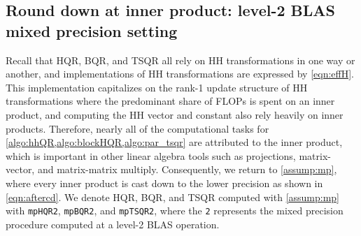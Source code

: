 \documentclass[review,onefignum,onetabnum]{siamart190516}
\begin{document}
\subsection{Round down at inner product: level-2 BLAS mixed precision setting}\label{sec:mp-2}
Recall that HQR, BQR, and TSQR all rely on HH transformations in one way or another, and implementations of HH transformations are expressed by \cref{eqn:effH}.
This implementation capitalizes on the rank-1 update structure of HH transformations where the predominant share of FLOPs is spent on an inner product, and computing the HH vector and constant also rely heavily on inner products.
Therefore, nearly all of the computational tasks for \cref{algo:hhQR,algo:blockHQR,algo:par_tsqr} are attributed to the inner product, which is important in other linear algebra tools such as projections, matrix-vector, and matrix-matrix multiply.
Consequently, we return to \cref{assump:mp}, where every inner product is cast down to the lower precision as shown in \cref{eqn:aftercd}. 
We denote HQR, BQR, and TSQR computed with \cref{assump:mp} with {\tt mpHQR2}, {\tt mpBQR2}, and {\tt mpTSQR2}, where the {\tt 2} represents the mixed precision procedure computed at a level-2 BLAS operation.
\end{document}
